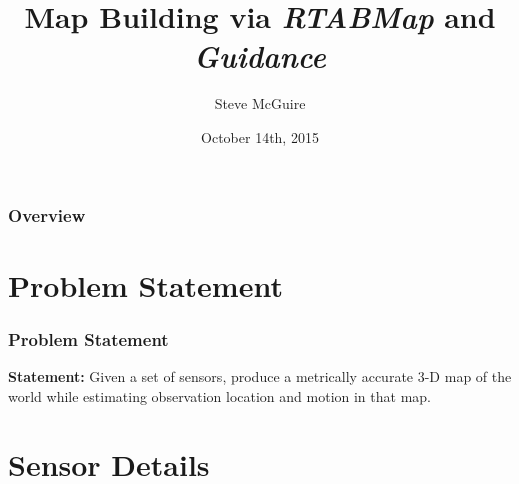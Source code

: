 \documentclass{beamer}
\title[RTABMap / \textit{Guidance} SLAM]{Map Building via \textit{RTABMap} and \textit{Guidance}} %
\author{Steve McGuire} %
\institute[] %
{
University of Colorado at Boulder \\ %
\medskip
\textit{} %
}
\date{October 14th, 2015} %
\begin{document}
\begin{frame}
\titlepage %
\end{frame}

\begin{frame}
\frametitle{Overview} %
\tableofcontents %
\end{frame}


\section{Problem Statement} %
\begin{frame}
\frametitle{Problem Statement}
\textbf{Statement:}
Given a set of sensors, produce a metrically accurate 3-D map of the world while estimating observation location and motion in that map.

\end{frame}

\section{Sensor Details}
\end{document}
